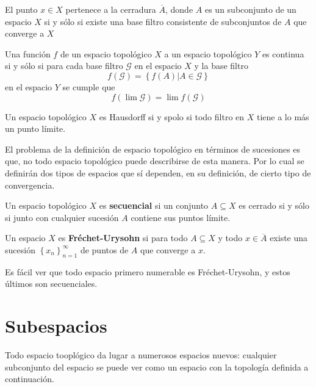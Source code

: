 \documentclass[12pt]{report}
\theoremstyle{largebreak}
\begin{document}
    \begin{propo}
        El punto $x\in X$ pertenece a la cerradura $\overline{A}$, donde $A$ es un subconjunto de un espacio $X$ si y sólo si existe una base filtro consistente de subconjuntos de $A$ que converge a $X$

        Una función $f$ de un espacio topológico $X$ a un espacio topológico $Y$ es continua si y sólo si para cada base filtro $\mathcal{G}$ en el espacio $X$ y la base filtro
         \begin{equation*}
            f(\mathcal{G})=\left\{f(A)|A\in\mathcal{G} \right\}
         \end{equation*}
         en el espacio $Y$ se cumple que
         \begin{equation*}
            f(\lim\mathcal{G})=\lim f(\mathcal{G})
         \end{equation*}
         
         Un espacio topológico $X$ es Hausdorff si y spolo si todo filtro en $X$ tiene a lo más un punto límite.
    \end{propo}

    El problema de la definición de espacio topológico en términos de sucesiones es que, no todo espacio topológico puede describirse de esta manera. Por lo cual se definirán dos tipos de espacios que sí dependen, en su definición, de cierto tipo de convergencia.

    \begin{mydef}
        Un espacio topológico $X$ es \textbf{secuencial} si un conjunto $A\subseteq X$ es cerrado si y sólo si junto con cualquier sucesión $A$ contiene sus puntos límite.

        Un espacio $X$ es \textbf{Fréchet-Urysohn} si para todo $A\subseteq  X$ y todo $x\in\overline{A}$ existe una sucesión $\left\{x_n\right\}_{n=1}^{\infty}$ de puntos de $A$ que converge a $x$.
    \end{mydef}

    Es fácil ver que todo espacio primero numerable es Fréchet-Urysohn, y estos últimos son secuenciales.

    \section{Subespacios}

    Todo espacio tooplógico da lugar a numerosos espacios nuevos: cualquier subconjunto del espacio se puede ver como un espacio con la topología definida a continuación.
\end{document}
